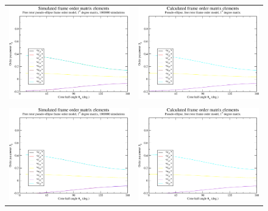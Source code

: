 \begin{figure}
\centering
  \begin{tabular}{@{}cc@{}}
    \includegraphics[width=.5\textwidth]{images/frame_order_matrix/Sij_pseudo-ellipse_free_rotor_out_of_frame_theta_x_ens1000000.eps} &
    \includegraphics[width=.5\textwidth]{images/frame_order_matrix/Sij_pseudo-ellipse_free_rotor_out_of_frame_theta_x_calc.eps} \\
    \\[-5pt]
    \includegraphics[width=.5\textwidth]{images/frame_order_matrix/Sij_pseudo-ellipse_free_rotor_out_of_frame_theta_y_ens1000000.eps} &
    \includegraphics[width=.5\textwidth]{images/frame_order_matrix/Sij_pseudo-ellipse_free_rotor_out_of_frame_theta_y_calc.eps} \\

\end{tabular}
\end{figure}
